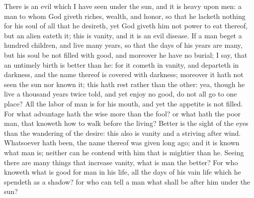 There is an evil which I have seen under the sun, and it is heavy upon men: a man to whom God giveth riches, wealth, and honor, so that he lacketh nothing for his soul of all that he desireth, yet God giveth him not power to eat thereof, but an alien eateth it; this is vanity, and it is an evil disease. If a man beget a hundred children, and live many years, so that the days of his years are many, but his soul be not filled with good, and moreover he have no burial; I say, that an untimely birth is better than he: for it cometh in vanity, and departeth in darkness, and the name thereof is covered with darkness; moreover it hath not seen the sun nor known it; this hath rest rather than the other: yea, though he live a thousand years twice told, and yet enjoy no good, do not all go to one place?  All the labor of man is for his mouth, and yet the appetite is not filled. For what advantage hath the wise more than the fool? or what hath the poor man, that knoweth how to walk before the living? Better is the sight of the eyes than the wandering of the desire: this also is vanity and a striving after wind.  Whatsoever hath been, the name thereof was given long ago; and it is known what man is; neither can he contend with him that is mightier than he. Seeing there are many things that increase vanity, what is man the better? For who knoweth what is good for man in his life, all the days of his vain life which he spendeth as a shadow? for who can tell a man what shall be after him under the sun? 

